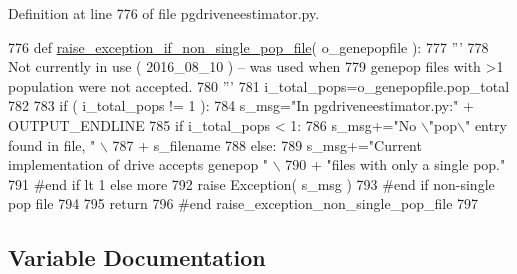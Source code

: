 Definition at line 776 of file pgdriveneestimator.\+py.


\begin{DoxyCode}
776 \textcolor{keyword}{def }\hyperlink{namespacenegui_1_1pgdriveneestimator_ac98833013f11d6aa3544b0fc60951632}{raise\_exception\_if\_non\_single\_pop\_file}( o\_genepopfile ):
777     \textcolor{stringliteral}{'''}
778 \textcolor{stringliteral}{    Not currently in use ( 2016\_08\_10 ) -- was used when}
779 \textcolor{stringliteral}{    genepop files with >1 population were not accepted.}
780 \textcolor{stringliteral}{    '''}
781     i\_total\_pops=o\_genepopfile.pop\_total
782 
783     \textcolor{keywordflow}{if} ( i\_total\_pops != 1 ):
784         s\_msg=\textcolor{stringliteral}{"In pgdriveneestimator.py:"} + OUTPUT\_ENDLINE
785         \textcolor{keywordflow}{if} i\_total\_pops < 1:
786             s\_msg+=\textcolor{stringliteral}{"No \(\backslash\)"pop\(\backslash\)" entry found in file, "} \(\backslash\)
787                     + s\_filename
788         \textcolor{keywordflow}{else}:
789             s\_msg+=\textcolor{stringliteral}{"Current implementation of drive accepts genepop "} \(\backslash\)
790                 + \textcolor{stringliteral}{"files with only a single pop."}
791         \textcolor{comment}{#end if lt 1 else more}
792         \textcolor{keywordflow}{raise} Exception( s\_msg )
793     \textcolor{comment}{#end if non-single pop file}
794 
795     \textcolor{keywordflow}{return}
796 \textcolor{comment}{#end raise\_exception\_non\_single\_pop\_file}
797 
\end{DoxyCode}


\subsection{Variable Documentation}
